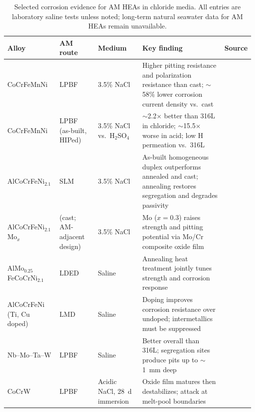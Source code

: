 \begin{table}[t]
\centering
\caption{Selected corrosion evidence for AM HEAs in chloride media. All entries are laboratory saline tests unless noted; long-term natural seawater data for AM HEAs remain unavailable.}
\label{tab:corrosion}
\footnotesize
\begin{tabularx}{\textwidth}{@{}llllX@{}}
\toprule
Alloy & AM route & Medium & Key finding & Source \\
\midrule
CoCrFeMnNi & LPBF & 3.5\% NaCl & Higher pitting resistance and polarization resistance than cast; $\sim$58\% lower corrosion current density vs.\ cast & \cite{han2025,cagirici2024} \\
CoCrFeMnNi & LPBF (as-built, HIPed) & 3.5\% NaCl vs.\ H$_2$SO$_4$ & $\sim$2.2$\times$ better than 316L in chloride; $\sim$15.5$\times$ worse in acid; low H permeation vs.\ 316L & \cite{lpbf_cantor_2024} \\
AlCoCrFeNi$_{2.1}$ & SLM & 3.5\% NaCl & As-built homogeneous duplex outperforms annealed and cast; annealing restores segregation and degrades passivity & \cite{slm_ehea_2025} \\
AlCoCrFeNi$_{2.1}$Mo$_x$ & (cast; AM-adjacent design) & 3.5\% NaCl & Mo ($x{=}0.3$) raises strength and pitting potential via Mo/Cr composite oxide film & \cite{mo_ehea_2026} \\
AlMo$_{0.25}$FeCoCrNi$_{2.1}$ & LDED & Saline & Annealing heat treatment jointly tunes strength and corrosion response & \cite{lded_almofeco2024} \\
AlCoCrFeNi (Ti, Cu doped) & LMD & Saline & Doping improves corrosion resistance over undoped; intermetallics must be suppressed & \cite{cagirici2024} \\
Nb--Mo--Ta--W & LPBF & Saline & Better overall than 316L; segregation sites produce pits up to $\sim$1~mm deep & \cite{cagirici2024} \\
CoCrW & LPBF & Acidic NaCl, 28~d immersion & Oxide film matures then destabilizes; attack at melt-pool boundaries & \cite{lpbf_coocrw2023} \\
\bottomrule
\end{tabularx}
\end{table}
